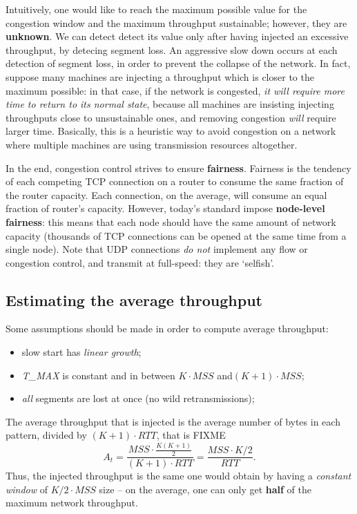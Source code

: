 \documentclass[a4paper, 11pt]{report}
\begin{document}
Intuitively, one would like to reach the maximum possible value for the
congestion window and the maximum throughput sustainable; however, they are
\textbf{unknown}. We can detect detect its value only after having injected an
excessive throughput, by detecing segment loss. An aggressive slow down occurs
at each detection of segment loss, in order to prevent the collapse of the
network. In fact, suppose many machines are injecting a throughput which is
closer to the maximum possible: in that case, if the network is congested,
\emph{it will require more time to return to its normal state}, because all
machines are insisting injecting throughputs close to unsustainable ones, and
removing congestion \emph{will} require larger time. Basically, this is a
heuristic way to avoid congestion on a network where multiple machines are
using transmission resources altogether.

In the end, congestion control strives to ensure \textbf{fairness}. Fairness is
the tendency of each competing TCP connection on a router to consume the same
fraction of the router capacity. Each connection, on the average, will consume
an equal fraction of router's capacity. However, today's standard impose
\textbf{node-level fairness}: this means that each node should have the same
amount of network capacity (thousands of TCP connections can be opened at the
same time from a single node). Note that UDP connections \emph{do not}
implement any flow or congestion control, and transmit at full-speed: they are
`selfish'.

\subsection{Estimating the average throughput}

Some assumptions should be made in order to compute average throughput:
\begin{itemize}
    \item slow start has \emph{linear growth};
    \item \emph{T\_MAX} is constant and in between $K\cdot MSS$ and$(K+1)\cdot MSS$;
    \item \emph{all} segments are lost at once (no wild retransmissions);
\end{itemize}

The average throughput that is injected is the average number of bytes in each
pattern, divided by $(K + 1)\cdot RTT$, that is FIXME
$$A_t = \frac{MSS\cdot \frac{K(K+1)}{2}}{(K+1)\cdot RTT} = \frac{MSS\cdot
K/2}{RTT}.$$ Thus, the injected throughput is the same one would obtain by
having a \emph{constant window} of $K/2 \cdot MSS$ size \--- on the average,
one can only get \textbf{half} of the maximum network throughput.
\end{document}
